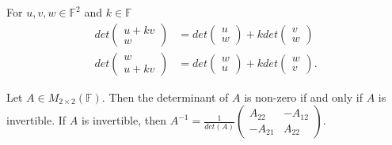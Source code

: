 \documentclass[12pt]{article}
\newenvironment{theorem}[2][Theorem]{\begin{trivlist}
\item[\hskip \labelsep {\bfseries #1}\hskip \labelsep {\bfseries #2.}]}{\end{trivlist}}
\begin{document}
\begin{theorem}{4.1}
For $u, v, w \in \mathbb{F}^2$ and $k \in \mathbb{F}$
\begin{align*}
    det \begin{pmatrix}
    u + kv \\ w
    \end{pmatrix} &= det \begin{pmatrix}
    u \\ w
    \end{pmatrix} + kdet \begin{pmatrix}
    v \\ w
    \end{pmatrix} \\ 
    det \begin{pmatrix}
    w \\ u + kv
    \end{pmatrix} &= det \begin{pmatrix}
    w \\ u
    \end{pmatrix} + kdet \begin{pmatrix}
    w \\ v
    \end{pmatrix}.
\end{align*}
\end{theorem}

\begin{theorem}{4.2}
Let $A \in M_{2 \times 2}(\mathbb{F})$. Then the determinant of $A$ is non-zero if and only if $A$ is invertible. If $A$ is invertible, then $A^{-1} = \frac{1}{det(A)}\begin{pmatrix}
A_{22} & -A_{12} \\ -A_{21} & A_{22}
\end{pmatrix}$.
\end{theorem}
\end{document}
